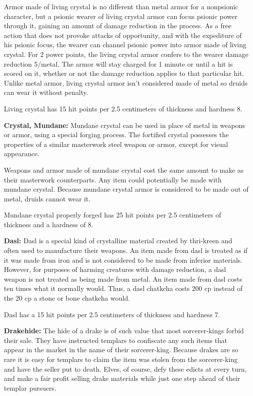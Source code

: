 Armor made of living crystal is no different than metal armor for a nonpsionic character, but a psionic wearer of living crystal armor can focus psionic power through it, gaining an amount of damage reduction in the process. As a free action that does not provoke attacks of opportunity, and with the expediture of his psionic focus, the wearer can channel psionic power into armor made of living crystal. For 2 power points, the living crystal armor confers to the wearer damage reduction 5/metal. The armor will stay charged for 1 minute or until a hit is scored on it, whether or not the damage reduction applies to that particular hit. Unlike metal armor, living crystal armor isn't considered made of metal so druids can wear it without penalty.

Living crystal has 15 hit points per 2.5 centimeters of thickness and hardness 8.

\textbf{Crystal, Mundane:} Mundane crystal can be used in place of metal in weapons or armor, using a special forging process. The fortified crystal possesses the properties of a similar masterwork steel weapon or armor, except for visual appearance.

Weapons and armor made of mundane crystal cost the same amount to make as their masterwork counterparts. Any item could potentially be made with mundane crystal. Because mundane crystal armor is considered to be made out of metal, druids cannot wear it.

Mundane crystal properly forged has 25 hit points per 2.5 centimeters of thickness and a hardness of 8.

\textbf{Dasl:} Dasl is a special kind of crystalline material created by thri-kreen and often used to manufacture their weapons. An item made from dasl is treated as if it was made from iron and is not considered to be made from inferior materials. However, for purposes of harming creatures with damage reduction, a dasl weapon is not treated as being made from metal. An item made from dasl costs ten times what it normally would. Thus, a dasl chatkcha costs 200 cp instead of the 20 cp a stone or bone chatkcha would.

Dasl has a 15 hit points per 2.5 centimeters of thickness and hardness 7.

\textbf{Drakehide:} The hide of a drake is of such value that most sorcerer-kings forbid their sale. They have instructed templars to confiscate any such items that appear in the market in the name of their sorcerer-king. Because drakes are so rare it is easy for templars to claim the item was stolen from the sorcerer-king and have the seller put to death. Elves, of course, defy these edicts at every turn, and make a fair profit selling drake materials while just one step ahead of their templar pursuers.


